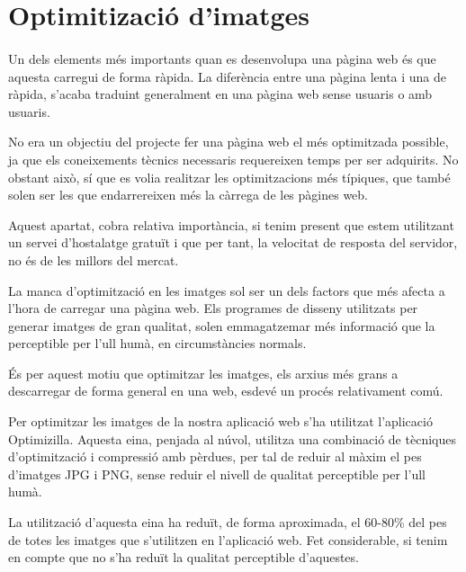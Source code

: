 \section{Optimitizació d'imatges}

    \paragraph{}
    Un dels elements més importants quan es desenvolupa una pàgina web és que aquesta carregui de forma ràpida. La diferència entre una pàgina lenta i una de ràpida, s'acaba traduint generalment en una pàgina web sense usuaris o amb usuaris.

    No era un objectiu del projecte fer una pàgina web el més optimitzada possible, ja que els coneixements tècnics necessaris requereixen temps per ser adquirits. No obstant això, sí que es volia realitzar les optimitzacions més típiques, que també solen ser les que endarrereixen més la càrrega de les pàgines web.

    Aquest apartat, cobra relativa importància, si tenim present que estem utilitzant un servei d'hostalatge gratuït i que per tant, la velocitat de resposta del servidor, no és de les millors del mercat.

    La manca d'optimització en les imatges sol ser un dels factors que més afecta a l'hora de carregar una pàgina web. Els programes de disseny utilitzats per generar imatges de gran qualitat, solen emmagatzemar més informació que la perceptible per l'ull humà, en circumstàncies normals.

    És per aquest motiu que optimitzar les imatges, els arxius més grans a descarregar de forma general en una web, esdevé un procés relativament comú.

    Per optimitzar les imatges de la nostra aplicació web s'ha utilitzat l'aplicació Optimizilla. Aquesta eina, penjada al núvol, utilitza una combinació de tècniques d'optimització i compressió amb pèrdues, per tal de reduir al màxim el pes d'imatges JPG i PNG, sense reduir el nivell de qualitat perceptible per l'ull humà.

    La utilització d'aquesta eina ha reduït, de forma aproximada, el 60-80\% del pes de totes les imatges que s'utilitzen en l'aplicació web. Fet considerable, si tenim en compte que no s'ha reduït la qualitat perceptible d'aquestes.
